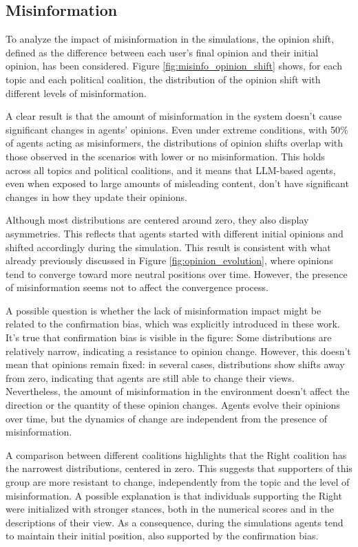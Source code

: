 \subsection{Misinformation}
To analyze the impact of misinformation in the simulations, the opinion shift, defined as the difference between each user's final opinion and their initial opinion, has been considered.
Figure \ref{fig:misinfo_opinion_shift} shows, for each topic and each political coalition, the distribution of the opinion shift with different levels of misinformation.

A clear result is that the amount of misinformation in the system doesn't cause significant changes in agents' opinions.
Even under extreme conditions, with 50\% of agents acting as misinformers, the distributions of opinion shifts overlap with those observed in the scenarios with lower or no misinformation.
This holds across all topics and political coalitions, and it means that LLM-based agents, even when exposed to large amounts of misleading content, don't have significant changes in how they update their opinions.

\medskip
Although most distributions are centered around zero, they also display asymmetries.
This reflects that agents started with different initial opinions and shifted accordingly during the simulation.
This result is consistent with what already previously discussed in Figure \ref{fig:opinion_evolution}, where opinions tend to converge toward more neutral positions over time.
However, the presence of misinformation seems not to affect the convergence process.

\medskip
A possible question is whether the lack of misinformation impact might be related to the confirmation bias, which was explicitly introduced in these work.
It's true that confirmation bias is visible in the figure: Some distributions are relatively narrow, indicating a resistance to opinion change.
However, this doesn't mean that opinions remain fixed: in several cases, distributions show shifts away from zero, indicating that agents are still able to change their views.
Nevertheless, the amount of misinformation in the environment doesn't affect the direction or the quantity of these opinion changes. Agents evolve their opinions over time, but the dynamics of change are independent from the presence of misinformation.

\medskip
A comparison between different coalitions highlights that the Right coalition has the narrowest distributions, centered in zero.
This suggests that supporters of this group are more resistant to change, independently from the topic and the level of misinformation.
A possible explanation is that individuals supporting the Right were initialized with stronger stances, both in the numerical scores and in the descriptions of their view. 
As a consequence, during the simulations agents tend to maintain their initial position, also supported by the confirmation bias.

